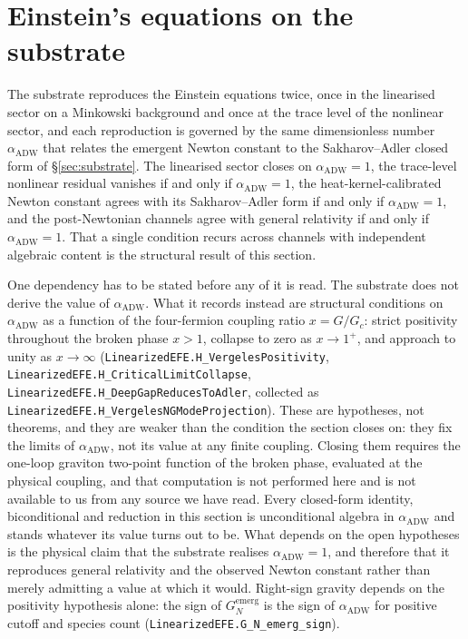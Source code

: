 \documentclass[aps,prd,nofootinbib,superscriptaddress,12pt]{revtex4-2}
\DeclareRobustCommand{\lb}{\discretionary{}{}{}}
\begin{document}
\section{Einstein's equations on the substrate}
\label{sec:efe}

The substrate reproduces the Einstein equations twice, once in the linearised
sector on a Minkowski background and once at the trace level of the nonlinear
sector, and each reproduction is governed by the same dimensionless number
$\alpha_{\mathrm{ADW}}$ that relates the emergent Newton constant to the
Sakharov--Adler closed form of \S\ref{sec:substrate}. The linearised sector
closes on $\alpha_{\mathrm{ADW}} = 1$, the trace-level nonlinear residual
vanishes if and only if $\alpha_{\mathrm{ADW}} = 1$, the heat-kernel-calibrated
Newton constant agrees with its Sakharov--Adler form if and only if
$\alpha_{\mathrm{ADW}} = 1$, and the post-Newtonian channels agree with general
relativity if and only if $\alpha_{\mathrm{ADW}} = 1$. That a single condition
recurs across channels with independent algebraic content is the structural
result of this section.

One dependency has to be stated before any of it is read. The substrate does
not derive the value of $\alpha_{\mathrm{ADW}}$. What it records instead are
structural conditions on $\alpha_{\mathrm{ADW}}$ as a function of the
four-fermion coupling ratio $x = G/G_c$: strict positivity throughout the broken
phase $x > 1$, collapse to zero as $x \to 1^{+}$, and approach to unity as
$x \to \infty$ (\texttt{Linearized\lb{}EFE.\lb{}H\_\lb{}Vergeles\lb{}Positivity},
\texttt{Linearized\lb{}EFE.\lb{}H\_\lb{}Critical\lb{}Limit\lb{}Collapse},
\texttt{Linearized\lb{}EFE.\lb{}H\_\lb{}Deep\lb{}Gap\lb{}Reduces\lb{}To\lb{}Adler}, collected as
\texttt{Linearized\lb{}EFE.\lb{}H\_\lb{}Vergeles\lb{}NGMode\lb{}Projection}). These are hypotheses, not
theorems, and they are weaker than the condition the section closes on: they fix
the limits of $\alpha_{\mathrm{ADW}}$, not its value at any finite coupling.
Closing them requires the one-loop graviton two-point function of the broken
phase, evaluated at the physical coupling, and that computation is not performed
here and is not available to us from any source we have read. Every closed-form
identity, biconditional and reduction in this section is unconditional algebra
in $\alpha_{\mathrm{ADW}}$ and stands whatever its value turns out to be. What
depends on the open hypotheses is the physical claim that the substrate realises
$\alpha_{\mathrm{ADW}} = 1$, and therefore that it reproduces general relativity
and the observed Newton constant rather than merely admitting a value at which
it would. Right-sign gravity depends on the positivity hypothesis alone: the
sign of $G_N^{\mathrm{emerg}}$ is the sign of $\alpha_{\mathrm{ADW}}$ for
positive cutoff and species count
(\texttt{Linearized\lb{}EFE.\lb{}G\_\lb{}N\_\lb{}emerg\_\lb{}sign}).
\end{document}
